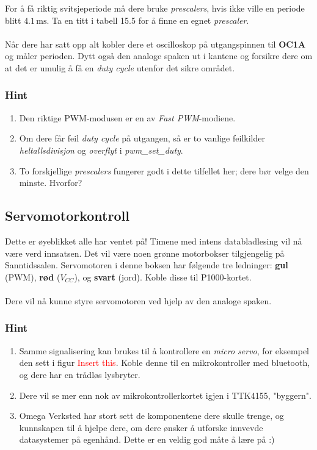 \documentclass[11pt,a4paper]{article}
\begin{document}
For å få riktig svitsjeperiode må dere bruke \textit{prescalers}, hvis ikke ville en periode blitt $4.1\,\mathrm{ms}$. Ta en titt i tabell 15.5 for å finne en egnet \textit{prescaler}.\\
\\
Når dere har satt opp alt kobler dere et oscilloskop på utgangspinnen til \textbf{OC1A} og måler perioden. Dytt også den analoge spaken ut i kantene og forsikre dere om at det er umulig å få en \textit{duty cycle} utenfor det sikre området.
\subsubsection{Hint}
\begin{enumerate}
\item Den riktige PWM-modusen er en av \textit{Fast PWM}-modiene.
\item Om dere får feil \textit{duty cycle} på utgangen, så er to vanlige feilkilder \textit{heltallsdivisjon} og \textit{overflyt} i \textit{pwm\_set\_duty}.
\item To forskjellige \textit{prescalers} fungerer godt i dette tilfellet her; dere bør velge den minste. Hvorfor?
\end{enumerate}
\subsection{Servomotorkontroll}
Dette er øyeblikket alle har ventet på! Timene med intens databladlesing vil nå være verd innsatsen. Det vil være noen grønne motorbokser tilgjengelig på Sanntidssalen. Servomotoren i denne boksen har følgende tre ledninger: \textbf{gul} (PWM), \textbf{rød} ($V_{CC}$), og \textbf{svart} (jord). Koble disse til P1000-kortet.\\
\\
Dere vil nå kunne styre servomotoren ved hjelp av den analoge spaken.
\subsubsection{Hint}
\begin{enumerate}
\item Samme signalisering kan brukes til å kontrollere en \textit{micro servo}, for eksempel den sett i figur \textcolor{red}{Insert this}. Koble denne til en mikrokontroller med bluetooth, og dere har en trådløs lysbryter.
\item Dere vil se mer enn nok av mikrokontrollerkortet igjen i TTK4155, "byggern".
\item Omega Verksted har stort sett de komponentene dere skulle trenge, og kunnskapen til å hjelpe dere, om dere ønsker å utforske innvevde datasystemer på egenhånd. Dette er en veldig god måte å lære på :)
\end{enumerate}
\end{document}
